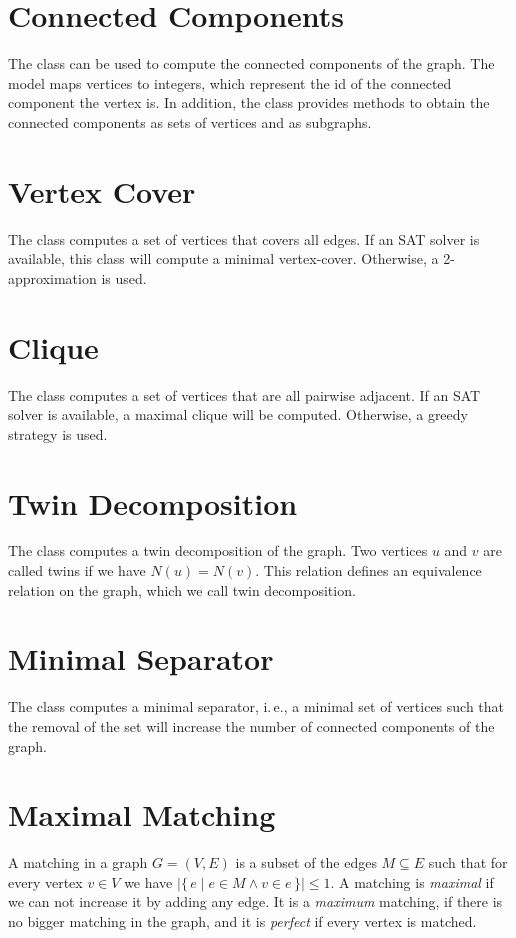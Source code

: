 \documentclass[a4paper, ukenglish, twoside, openright]{jdrasilmanual}
\begin{document}
\section{Connected Components}
The class  can be used to compute the
connected components of the graph. The model maps vertices to
integers, which represent the id of the connected component the vertex
is. In addition, the class provides methods to obtain the connected
components as sets of vertices and as subgraphs.

\section{Vertex Cover}
The class  computes a set of vertices that covers all edges. If an SAT solver is
available, this class will compute a minimal vertex-cover. Otherwise,
a 2-approximation is used.

\section{Clique}
The class  computes a set of vertices that are all pairwise adjacent. If an SAT
solver is available, a maximal clique will be computed. Otherwise, a
greedy strategy is used.

\section{Twin Decomposition}
The class  computes a twin decomposition of
the graph. Two vertices $u$ and $v$ are
called twins if we have $N(u)=N(v)$. This relation defines an
equivalence relation on the graph, which we call twin decomposition.

\section{Minimal Separator}
The class  computes a minimal separator, i.\,e., a minimal set of vertices such
that the removal of the set will increase the number of connected
components of the graph.

\section{Maximal Matching}
A matching in a graph \(G=(V,E)\) is a subset of the edges
\(M\subseteq E\) such that for every vertex \(v\in V\) we have
\(|\{\,e\mid e\in M\wedge v\in e\,\}|\leq 1\). A matching is \emph{maximal} if
we can not increase it by adding any edge. It is a \emph{maximum} matching,
if there is no bigger matching in the graph, and it is \emph{perfect} if
every vertex is matched.
  
\end{document}
